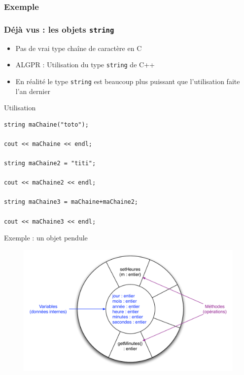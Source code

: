 \subsubsection{Exemple}


\begin{frame}[fragile]
\frametitle{Déjà vus : les objets \texttt{string}}
\begin{itemize}
\item Pas de vrai type chaîne de caractère en C
\item ALGPR : Utilisation du type \texttt{string} de C++
\item En réalité le type \texttt{string} est beaucoup plus puissant que l'utilisation faite l'an dernier
\end{itemize}
\begin{exampleblock}{Utilisation}
\begin{lstlisting}
string maChaine("toto");

cout << maChaine << endl;

string maChaine2 = "titi";

cout << maChaine2 << endl;

string maChaine3 = maChaine+maChaine2;

cout << maChaine3 << endl;
\end{lstlisting}
\end{exampleblock}
\end{frame}
\begin{frame}{{\href{code/Pendule.cxx}{}} Exemple : un objet pendule}
  \begin{figure}[htbp]
    \begin{center}
      \includegraphics[scale=.45]{fig/encapsulation2.pdf}
    \end{center}
  \end{figure}
\end{frame}

